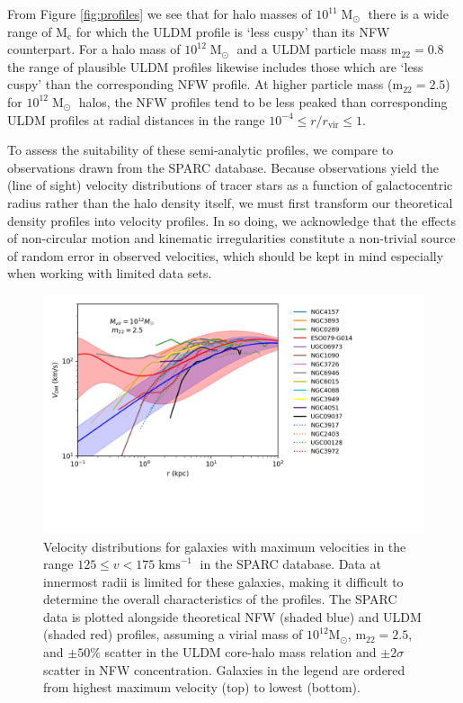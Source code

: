 \documentclass{pasa}%
\begin{document}
From Figure \ref{fig:profiles} we see that for halo masses of $10^{11}\operatorname{M}_{\odot}$ there is a wide range of $\mathrm{M_c}$ for which the ULDM profile is `less cuspy' than its NFW counterpart. For a halo mass of $10^{12}\operatorname{M}_{\odot}$ and a ULDM particle mass $\mathrm{m_{22}}=0.8$ the range of plausible ULDM profiles likewise includes those which are `less cuspy' than the corresponding NFW profile. At higher particle mass ($\mathrm{m_{22}}=2.5$) for $10^{12}\operatorname{M}_{\odot}$ halos, the NFW profiles tend to be less peaked than corresponding ULDM profiles at radial distances in  the range $10^{-4}\leq r/r_{\mathrm{vir}} \leq 1$.  

To assess the suitability of these semi-analytic profiles, we compare to observations drawn from the SPARC database. Because observations yield the (line of sight) velocity distributions of tracer stars as a function of galactocentric radius rather than the halo density itself, we must first transform our theoretical density profiles into velocity profiles. In so doing, we acknowledge that the effects of non-circular motion and kinematic irregularities constitute a non-trivial source of random error in observed velocities, which should be kept in mind especially when working with limited data sets. 


\begin{figure}[t]
\centering
\includegraphics[scale=0.9, trim={0cm 2.5cm 3cm 0cm}]{000_vs_SPARC_10_12.png}
\caption{Velocity distributions for galaxies with maximum velocities in the range $125 \leq v < 175\operatorname{kms}^{-1}$ in the SPARC database. Data at innermost radii is limited for these galaxies, making it difficult to determine the overall characteristics of the profiles. The SPARC data is plotted alongside theoretical NFW (shaded blue) and ULDM (shaded red) profiles, assuming a virial mass of $10^{12} \mathrm{M}_{\odot}$, $\mathrm{m_{22}} = 2.5$, and $\pm 50 \%$ scatter in the ULDM core-halo mass relation and $\pm2\sigma$ scatter in NFW concentration. Galaxies in the legend are ordered from highest maximum velocity (top) to lowest (bottom).}\label{fig:high_v} 
\end{figure}
\end{document}
